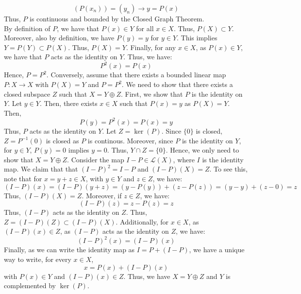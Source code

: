 \documentclass[12pt]{article}
\begin{document}
\begin{solution}
    \[ (P(x_n)) = (y_n) \to y = P(x)\]
    Thus, $P$ is continuous and bounded by the Closed Graph Theorem. \\
     \bbni
    By definition of $P$, we have that $P(x) \in Y$ for all $x \in X$. Thus, $P(X) \subset Y$. Moreover, also by definition, we have $P(y) = y$ for $y \in Y$. This implies $Y = P(Y) \subset P(X)$. Thus, $P(X) = Y$. \bbni
    Finally, for any $x \in X$, as $P(x) \in Y$, we have that $P$ acts as the identity on $Y$. Thus, we have:
    \[ P^2(x) = P(x)\]
    Hence, $P = P^2$. \bbni
    Conversely, assume that there exists a bounded linear map $P: X \to X$ with $P(X) = Y$ and $P = P^2$. We need to show that there exists a closed subspace $Z$ such that $X = Y \oplus Z$. \bbni
    First, we show that $P$ is the identity on $Y$. Let $y \in Y$. Then, there exists $x \in X$ such that $P(x) = y$ as $P(X) = Y$. Then, 
    \[ P(y) = P^2(x) = P(x) = y\]
    Thus, $P$ acts as the identity on $Y$. \bbni 
    Let $Z = \ker(P)$. Since $\{0\}$ is closed, $Z = P^{-1}(0)$ is closed as $P$ is continous. Moreover, since $P$ is the identity on $Y$, for $y \in Y$, $P(y) = 0$ implies $y = 0$. Thus, $Y \cap Z = \{0\}$. Hence, we only need to show that $X = Y \oplus Z$.  \bbni    
    Consider the map $I-P \in \mathcal L(X)$, where $I$ is the identity map. We claim that that $(I-P)^2 = I-P$ and $(I-P)(X) = Z$. To see this, note that for $x = y+z \in X$, with $y \in Y$ and $z \in Z$, we have:
    \[ (I-P)(x) = (I-P)(y+z) = (y-P(y))+(z-P(z)) = (y-y)+(z-0) = z\]
    Thus, $(I-P)(X) = Z$. Moreover, if $z \in Z$, we have: 
    \[ (I-P)(z) = z-P(z) = z\]
    Thus, $(I-P)$ acts as the identity on $Z$. Thus, $Z = (I-P)(Z) \subset (I-P)(X)$. Additionally, for $x \in X$, as $(I-P)(x) \in Z$, as $(I-P)$ acts as the identity on $Z$, we have: 
    \[ (I-P)^2(x) = (I-P)(x)\]
    Finally, as we can write the identity map as $I = P + (I-P)$, we have a unique way to write, for every $x \in X$, 
    \[ x = P(x) + (I-P)(x)\]
    with $P(x) \in Y$ and $(I-P)(x) \in Z$. Thus, we have $X = Y \oplus Z$ and $Y$ is complemented by $\ker(P)$. \bbni






    
    
    
\end{solution}
\newpage
\end{document}
